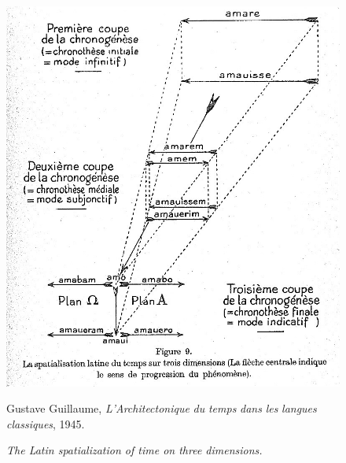 \documentclass[output=paper]{langsci/langscibook}
\begin{document}
\begin{figure}
\includegraphics[width=\textwidth]{figures/03/Kap.3.001.jpg}
\label{fig: 1} 
\caption{\textit{The Latin spatialization of time on three dimensions.}}

Gustave Guillaume, \textit{L'Architectonique} \textit{du} \textit{temps} \textit{dans} \textit{les} \textit{langues} \textit{classiques}, 1945. 
\citealt[37]{guillaume_larchitectonique_1965}

\end{figure}
\\
\end{document}
